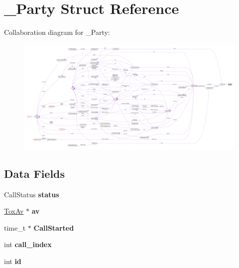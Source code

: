 \hypertarget{struct___party}{\section{\+\_\+\+Party Struct Reference}
\label{struct___party}
}


Collaboration diagram for \+\_\+\+Party\+:
\nopagebreak
\begin{figure}[H]
\begin{center}
\leavevmode
\includegraphics[width=350pt]{struct___party__coll__graph}
\end{center}
\end{figure}
\subsection*{Data Fields}
\begin{DoxyCompactItemize}
\item 
\hypertarget{struct___party_a722fcd2c2e22cc6de0a53383e5871290}{Call\+Status {\bfseries status}}\label{struct___party_a722fcd2c2e22cc6de0a53383e5871290}

\item 
\hypertarget{struct___party_abcfe1d5431cfdb232964a0a3380f4e7e}{\hyperlink{struct___tox_av}{Tox\+Av} $\ast$ {\bfseries av}}\label{struct___party_abcfe1d5431cfdb232964a0a3380f4e7e}

\item 
\hypertarget{struct___party_a1695e5be04a1b45020f50e3a42d0e50c}{time\+\_\+t $\ast$ {\bfseries Call\+Started}}\label{struct___party_a1695e5be04a1b45020f50e3a42d0e50c}

\item 
\hypertarget{struct___party_a80d8424fa1a3824067bbf99be2b3b0c4}{int {\bfseries call\+\_\+index}}\label{struct___party_a80d8424fa1a3824067bbf99be2b3b0c4}

\item 
\hypertarget{struct___party_a7441ef0865bcb3db9b8064dd7375c1ea}{int {\bfseries id}}\label{struct___party_a7441ef0865bcb3db9b8064dd7375c1ea}

\end{DoxyCompactItemize}


